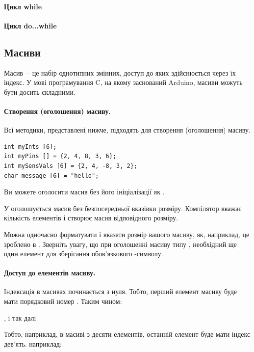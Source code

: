 \documentclass[12pt,a4paper]{book}  %
\begin{document}
\paragraph{Цикл while}
\paragraph{Цикл do...while}

\subsection{Масиви}

Масив~-- це набір однотипних змінних, доступ до яких здійснюється через їх індекс. У мові програмування C, на якому заснований Arduino, масиви можуть бути досить складними.

\paragraph{Створення (оголошення) масиву.} 
Всі методики, представлені нижче, підходять для створення (оголошення) масиву.

\begin{lstlisting}[label=conditionoperator,caption=Оголошення масиву]
int myInts [6];
int myPins [] = {2, 4, 8, 3, 6};
int mySensVals [6] = {2, 4, -8, 3, 2};
char message [6] = "hello";
\end{lstlisting}

Ви можете оголосити масив без його ініціалізації як .

У  оголошується масив без безпосередньої вказівки розміру. Компілятор вважає кількість елементів і створює масив відповідного розміру.

Можна одночасно форматувати і вказати розмір вашого масиву, як, наприклад, це зроблено в . Зверніть увагу, що при оголошенні масиву типу , необхідний ще один елемент для зберігання обов'язкового -символу.

\paragraph{Доступ до елементів масиву.}
Індексація в масивах починається з нуля. Тобто, перший елемент масиву буде мати порядковий номер . Таким чином:

, і так далі

Тобто, наприклад, в масиві з десяти елементів, останній елемент буде мати індекс дев'ять. наприклад:
\end{document}
